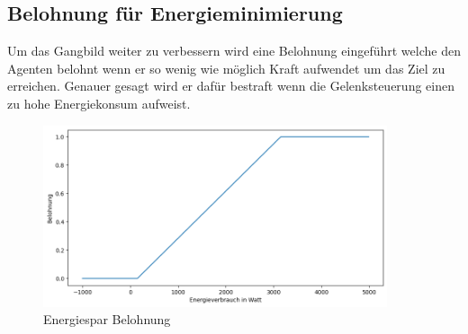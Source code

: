 \subsection{Belohnung für Energieminimierung}
Um das Gangbild weiter zu verbessern wird eine Belohnung eingeführt welche den Agenten belohnt wenn er so wenig wie möglich Kraft aufwendet um das Ziel zu erreichen. Genauer gesagt wird er dafür bestraft wenn die Gelenksteuerung einen zu hohe Energiekonsum aufweist.
\begin{figure}[H]
  \centering
  \includegraphics[width=0.9\textwidth]{img/plot_energiespar} 
  \caption{Energiespar Belohnung}
  \label{fig:plot_energiespar}
\end{figure}

